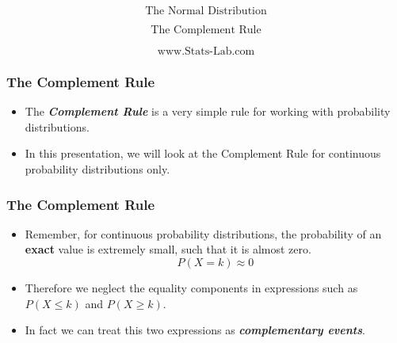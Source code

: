 \documentclass{beamer}
\begin{document}
\begin{frame}
\bigskip
{\Huge \[ \mbox{The Normal Distribution}\] }

{\huge \[ \mbox{The Complement Rule}\] }

\bigskip

{\Large \[ \mbox{www.Stats-Lab.com} \]}
\end{frame}
\begin{frame}
\frametitle{The Complement Rule}
\Large
\begin{itemize}
\item The \textbf{\textit{Complement Rule}} is a very simple rule for working with probability distributions.
\item In this presentation, we will look at the Complement Rule for continuous probability distributions only.

\end{itemize}
\end{frame}

\begin{frame}
\frametitle{The Complement Rule}
\Large
\begin{itemize}

\item Remember, for continuous probability distributions, the probability of an \textbf{exact} value is extremely small, such that it is almost zero.
\[P(X = k) \approx 0\]
\item Therefore we neglect the equality components in expressions such as
$P(X \leq k)$ and $P(X \geq k)$.
\item In fact we can treat this two expressions as \textbf{\textit{complementary events}}.
\end{itemize}
\end{frame}
\end{document}
